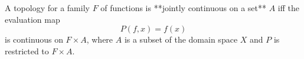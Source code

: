 A topology for a family $F$ of functions is **jointly continuous on a set** $A$ iff the evaluation map
$$P(f,x) = f(x)$$
is continuous on $F \times A$, where $A$ is a subset of the domain space $X$ and $P$ is restricted to $F \times A$.
